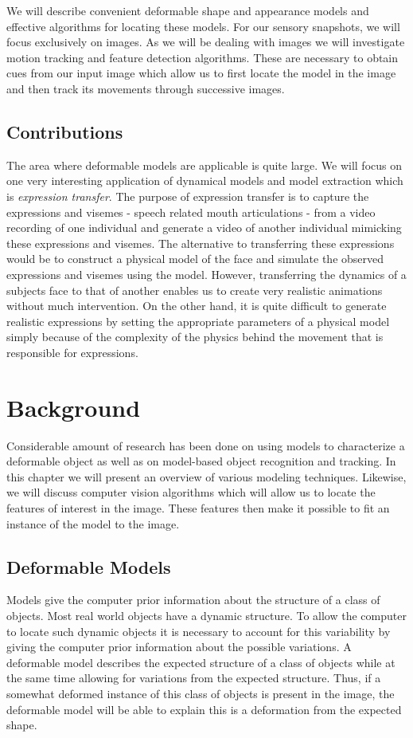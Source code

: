 \documentclass[11pt,a4paper]{report}
\begin{document}
We will describe convenient deformable shape
and appearance models and effective algorithms for locating these models. For our
sensory snapshots, we will focus exclusively on images. As we will be dealing
with images we will investigate motion tracking and feature detection
algorithms. These are necessary to obtain cues from our input image which allow
us to first locate the model in the image and then track its movements through
successive images.

\section{Contributions}

The area where deformable models are applicable is quite large. We will focus on one very interesting application of dynamical
models and model extraction which is
\textit{expression transfer}. The purpose of expression transfer is to capture
the expressions and visemes -
speech related mouth articulations - from a video recording of one individual and
generate a video of another individual mimicking these
expressions and visemes. The alternative to transferring these expressions would
be to construct a physical model of the face and simulate the observed
expressions and visemes using the model. However, transferring the dynamics of a subjects face to that of another enables us to
create very realistic animations without much intervention. On the other hand, it
is quite difficult to generate realistic expressions by setting the appropriate
parameters of a physical model simply because of the complexity of the physics
behind the movement that is responsible for expressions.


\newpage

\chapter{Background}
Considerable amount of research has been done on using models to characterize a
deformable object as well as on model-based object recognition and
tracking. In this chapter we will present an overview of various modeling techniques. Likewise, we will discuss
computer vision algorithms which will allow us to locate the features of
interest in the image. These features then make it possible to fit an instance
of the model to the image.

\section{Deformable Models}
Models give the computer prior information about the structure of a class of objects. Most
real world objects have a dynamic structure. To allow the computer to locate
such dynamic objects it is necessary to account for this variability by giving the
computer prior information about the possible variations. A deformable model
describes the expected structure of a class of objects while at the same time allowing
for variations from the expected structure. Thus, if a somewhat deformed
instance of this class of objects is present in the image, the deformable model
will be able to explain this is a deformation from the expected shape.
\end{document}
